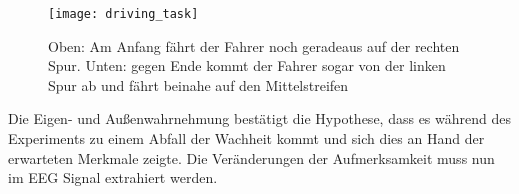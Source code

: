 \begin{figure}[h] 
  \begin{center}
    \texttt{[image: driving\_task]}
    \caption[Driving Task Spurwechsel]{Oben: Am Anfang fährt der Fahrer noch geradeaus auf der rechten Spur. Unten: gegen Ende kommt der Fahrer sogar von der linken Spur ab und fährt beinahe auf den Mittelstreifen \label{fig:driving_task}}
  \end{center}
\end{figure}

Die Eigen- und Außenwahrnehmung bestätigt die Hypothese, dass es während des Experiments zu einem Abfall der Wachheit kommt und sich dies an Hand der erwarteten Merkmale zeigte. Die Veränderungen der Aufmerksamkeit muss nun im EEG Signal extrahiert werden.